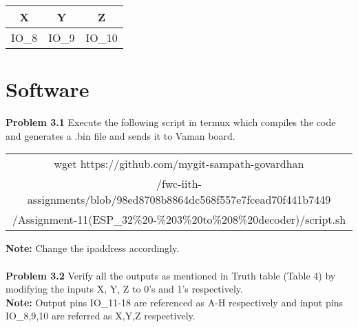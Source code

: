 \documentclass[journal,12pt,twocolumn]{IEEEtran}
\begin{document}
    \begin{table}[h]
    \centering
    \begin{tabular}{| c | c | c |}
    \hline
    \textbf{X} & \textbf{Y} & \textbf{Z} \\
    \hline
    IO\_8 & IO\_9 & IO\_10  \\
    \hline
    \end{tabular}
    \caption{}
    \label{tab:my_label}
 \end{table}


\section{Software}
\textbf{Problem 3.1} Execute the following script in termux which compiles the code and generates a .bin file and sends it to Vaman board. \\
\vspace{1cm}
\begin{table}[h]
    \centering
    \begin{tabular}{| c |}
    \hline
wget https://github.com/mygit-sampath-govardhan\\/fwc-iith-assignments/blob/98ed8708b8864dc568f557e7fcead70f441b7449\\/Assignment-11(ESP\_32\%20-\%203\%20to\%208\%20decoder)/script.sh\\
    \hline
    \end{tabular}
\end{table}
\textbf{Note:} Change the ipaddress accordingly.\\
\\
\textbf{Problem 3.2} Verify all the outputs as mentioned in Truth table (Table 4) by modifying the inputs X, Y, Z to 0's and 1's respectively. \\

\textbf{Note:} Output pins IO\_11-18 are referenced as A-H respectively and input pins IO\_8,9,10 are referred as X,Y,Z respectively.\\
\end{document}

